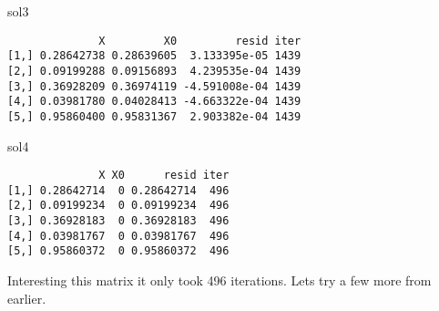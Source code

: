 \documentclass[]{article}
\newenvironment{Shaded}{\begin{snugshade}}{\end{snugshade}}
\newcommand{\KeywordTok}[1]{\textcolor[rgb]{0.13,0.29,0.53}{\textbf{#1}}}
\newcommand{\DataTypeTok}[1]{\textcolor[rgb]{0.13,0.29,0.53}{#1}}
\newcommand{\DecValTok}[1]{\textcolor[rgb]{0.00,0.00,0.81}{#1}}
\newcommand{\FloatTok}[1]{\textcolor[rgb]{0.00,0.00,0.81}{#1}}
\newcommand{\StringTok}[1]{\textcolor[rgb]{0.31,0.60,0.02}{#1}}
\newcommand{\CommentTok}[1]{\textcolor[rgb]{0.56,0.35,0.01}{\textit{#1}}}
\newcommand{\OperatorTok}[1]{\textcolor[rgb]{0.81,0.36,0.00}{\textbf{#1}}}
\newcommand{\NormalTok}[1]{#1}
\begin{document}
\begin{Shaded}
\begin{Highlighting}[]
\NormalTok{sol3}
\end{Highlighting}
\end{Shaded}

\begin{verbatim}
              X         X0         resid iter
[1,] 0.28642738 0.28639605  3.133395e-05 1439
[2,] 0.09199288 0.09156893  4.239535e-04 1439
[3,] 0.36928209 0.36974119 -4.591008e-04 1439
[4,] 0.03981780 0.04028413 -4.663322e-04 1439
[5,] 0.95860400 0.95831367  2.903382e-04 1439
\end{verbatim}

\begin{Shaded}
\begin{Highlighting}[]
\NormalTok{sol4}
\end{Highlighting}
\end{Shaded}

\begin{verbatim}
              X X0      resid iter
[1,] 0.28642714  0 0.28642714  496
[2,] 0.09199234  0 0.09199234  496
[3,] 0.36928183  0 0.36928183  496
[4,] 0.03981767  0 0.03981767  496
[5,] 0.95860372  0 0.95860372  496
\end{verbatim}

Interesting this matrix it only took 496 iterations. Lets try a few more
from earlier.

\begin{Shaded}
\end{Shaded}
\end{document}
